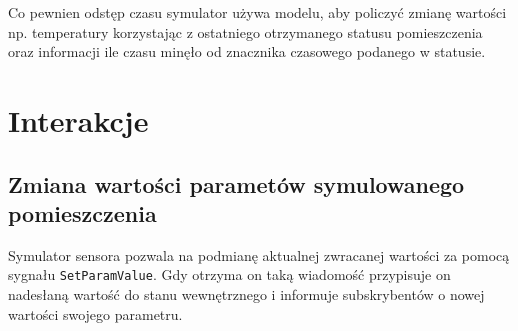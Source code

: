 Co pewnien odstęp czasu symulator używa modelu, aby policzyć zmianę wartości np. temperatury korzystając z ostatniego otrzymanego statusu pomieszczenia oraz informacji ile czasu minęło od znacznika czasowego podanego w statusie.

\section{Interakcje}


\subsection{Zmiana wartości parametów symulowanego pomieszczenia}
Symulator sensora pozwala na podmianę aktualnej zwracanej wartości za pomocą sygnału \lstinline{SetParamValue}. Gdy otrzyma on taką wiadomość przypisuje on nadesłaną wartość do stanu wewnętrznego i informuje subskrybentów o nowej wartości swojego parametru. 